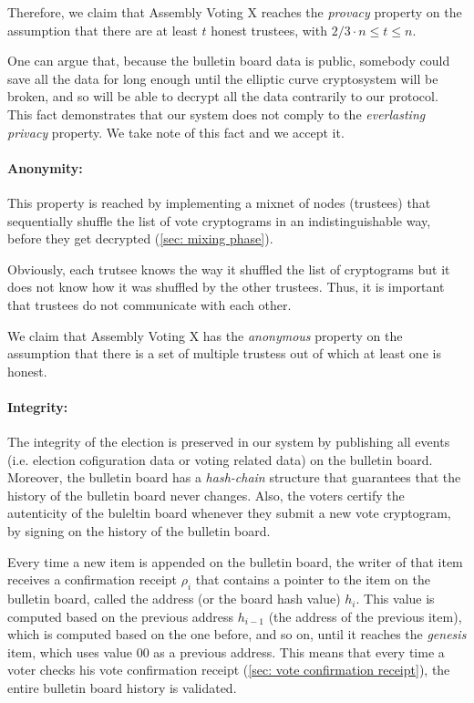 Therefore, we claim that Assembly Voting X reaches the \textit{provacy} property on the assumption that there are at least $t$ honest trustees, with $2/3 \cdot n \leq t \leq n$.

One can argue that, because the bulletin board data is public, somebody could save all the data for long enough until the elliptic curve cryptosystem will be broken, and so will be able to decrypt all the data contrarily to our protocol. This fact demonstrates that our system does not comply to the \textit{everlasting privacy} property. We take note of this fact and we accept it.


\paragraph{Anonymity:}
This property is reached by implementing a mixnet of nodes (trustees) that sequentially shuffle the list of vote cryptograms in an indistinguishable way, before they get decrypted (\cref{sec: mixing phase}).

Obviously, each trutsee knows the way it shuffled the list of cryptograms but it does not know how it was shuffled by the other trustees. Thus, it is important that trustees do not communicate with each other.

We claim that Assembly Voting X has the \textit{anonymous} property on the assumption that there is a set of multiple trustess out of which at least one is honest.


\paragraph{Integrity:}
The integrity of the election is preserved in our system by publishing all events (i.e. election cofiguration data or voting related data) on the bulletin board. Moreover, the bulletin board has a \textit{hash-chain} structure that guarantees that the history of the bulletin board never changes. Also, the voters certify the autenticity of the buleltin board whenever they submit a new vote cryptogram, by signing on the history of the bulletin board.

Every time a new item is appended on the bulletin board, the writer of that item receives a confirmation receipt $\rho_i$ that contains a pointer to the item on the bulletin board, called the address (or the board hash value) $h_i$. This value is computed based on the previous address $h_{i-1}$ (the address of the previous item), which is computed based on the one before, and so on, until it reaches the \textit{genesis} item, which uses value 00 as a previous address. This means that every time a voter checks his vote confirmation receipt (\ref{sec: vote confirmation receipt}), the entire bulletin board history is validated.

